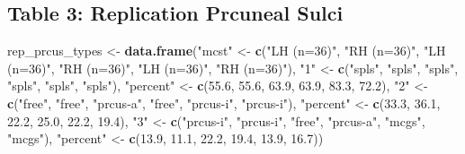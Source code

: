 \documentclass[
]{article}
\newenvironment{Shaded}{\begin{snugshade}}{\end{snugshade}}
\newcommand{\FloatTok}[1]{\textcolor[rgb]{0.00,0.00,0.81}{#1}}
\newcommand{\KeywordTok}[1]{\textcolor[rgb]{0.13,0.29,0.53}{\textbf{#1}}}
\newcommand{\NormalTok}[1]{#1}
\newcommand{\StringTok}[1]{\textcolor[rgb]{0.31,0.60,0.02}{#1}}
\begin{document}
\hypertarget{table-3-replication-prcuneal-sulci}{%
\subsection{Table 3: Replication Prcuneal
Sulci}\label{table-3-replication-prcuneal-sulci}}

\begin{Shaded}
\begin{Highlighting}[]
\NormalTok{rep_prcus_types <-}\StringTok{ }\KeywordTok{data.frame}\NormalTok{(}\StringTok{"mcst"}\NormalTok{ <-}\StringTok{ }\KeywordTok{c}\NormalTok{(}\StringTok{"LH (n=36)"}\NormalTok{, }\StringTok{"RH (n=36)"}\NormalTok{, }\StringTok{"LH (n=36)"}\NormalTok{, }\StringTok{"RH (n=36)"}\NormalTok{, }\StringTok{"LH (n=36)"}\NormalTok{, }\StringTok{"RH (n=36)"}\NormalTok{),}
                               \StringTok{"1"}\NormalTok{ <-}\StringTok{ }\KeywordTok{c}\NormalTok{(}\StringTok{"spls"}\NormalTok{, }\StringTok{"spls"}\NormalTok{,    }\StringTok{"spls"}\NormalTok{, }\StringTok{"spls"}\NormalTok{,    }\StringTok{"spls"}\NormalTok{, }\StringTok{"spls"}\NormalTok{),}
                               \StringTok{"percent"}\NormalTok{ <-}\StringTok{ }\KeywordTok{c}\NormalTok{(}\FloatTok{55.6}\NormalTok{, }\FloatTok{55.6}\NormalTok{,   }\FloatTok{63.9}\NormalTok{, }\FloatTok{63.9}\NormalTok{,        }\FloatTok{83.3}\NormalTok{, }\FloatTok{72.2}\NormalTok{),}
                               \StringTok{"2"}\NormalTok{ <-}\StringTok{ }\KeywordTok{c}\NormalTok{(}\StringTok{"free"}\NormalTok{, }\StringTok{"free"}\NormalTok{,    }\StringTok{"prcus-a"}\NormalTok{, }\StringTok{"free"}\NormalTok{,    }\StringTok{"prcus-i"}\NormalTok{, }\StringTok{"prcus-i"}\NormalTok{),}
                               \StringTok{"percent"}\NormalTok{ <-}\StringTok{ }\KeywordTok{c}\NormalTok{(}\FloatTok{33.3}\NormalTok{, }\FloatTok{36.1}\NormalTok{,   }\FloatTok{22.2}\NormalTok{, }\FloatTok{25.0}\NormalTok{,           }\FloatTok{22.2}\NormalTok{, }\FloatTok{19.4}\NormalTok{),}
                               \StringTok{"3"}\NormalTok{ <-}\StringTok{ }\KeywordTok{c}\NormalTok{(}\StringTok{"prcus-i"}\NormalTok{, }\StringTok{"prcus-i"}\NormalTok{,  }\StringTok{"free"}\NormalTok{, }\StringTok{"prcus-a"}\NormalTok{,    }\StringTok{"mcgs"}\NormalTok{, }\StringTok{"mcgs"}\NormalTok{),}
                               \StringTok{"percent"}\NormalTok{ <-}\StringTok{ }\KeywordTok{c}\NormalTok{(}\FloatTok{13.9}\NormalTok{, }\FloatTok{11.1}\NormalTok{,        }\FloatTok{22.2}\NormalTok{, }\FloatTok{19.4}\NormalTok{,           }\FloatTok{13.9}\NormalTok{, }\FloatTok{16.7}\NormalTok{))}


\end{Highlighting}
\end{Shaded}
\end{document}
